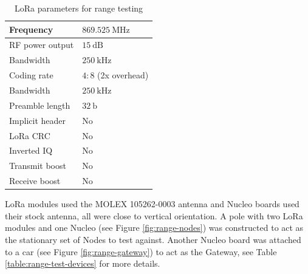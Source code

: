 \begin{table}[H]
\begin{center}
\caption{\label{table:range-test-parameters}LoRa parameters for range testing}
    \begin{tabular}{|l|l|} \hline
    Frequency             & $869.525~\mathrm{MHz}$\\ \hline
    RF power output       & $15~\mathrm{dB}$\\ \hline
    Bandwidth             & $250~\mathrm{kHz}$\\ \hline
    Coding rate           & $4:8$ (2x overhead) \\ \hline
    Bandwidth             & $250~\mathrm{kHz}$\\ \hline
    Preamble length       & $32~\mathrm{b}$\\ \hline
    Implicit header       & No\\ \hline
    LoRa CRC              & No\\ \hline
    Inverted IQ           & No\\ \hline
    Transmit boost        & No\\ \hline
    Receive boost         & No\\ \hline
    \end{tabular}
\end{center}
\end{table}

LoRa modules used the MOLEX 105262-0003 antenna and Nucleo boards used their stock antenna, all were close to vertical orientation. A pole with two LoRa modules and one Nucleo (see Figure \ref{fig:range-nodes}) was constructed to act as the stationary set of Nodes to test against. Another Nucleo board was attached to a car (see Figure \ref{fig:range-gateway}) to act as the Gateway, see Table \ref{table:range-test-devices} for more details.

